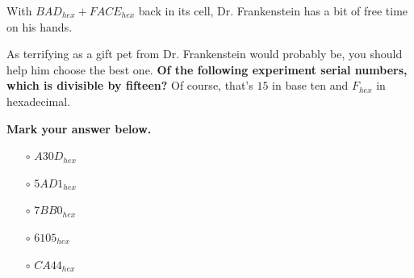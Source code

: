 


With \(BAD_{hex}+FACE_{hex}\) back in its cell, Dr. Frankenstein has a bit
of free time on his hands.

As terrifying as a gift pet from Dr. Frankenstein would probably be, you should
help him choose the best one. \textbf{Of the following experiment
serial numbers, which is divisible by fifteen?} Of course, that's
\(15\) in base ten and \(F_{hex}\) in hexadecimal.


\vspace{2em}

\textbf{Mark your answer below.}

\begin{itemize}
  \item[\Huge\(\circ\)] \(A30D_{hex}\)
  \item[\Huge\(\circ\)] \(5AD1_{hex}\)
  \item[\Huge\(\circ\)] \(7BB0_{hex}\)
  \item[\Huge\(\circ\)] \(6105_{hex}\)
  \item[\Huge\(\circ\)] \(CA44_{hex}\)
\end{itemize}
